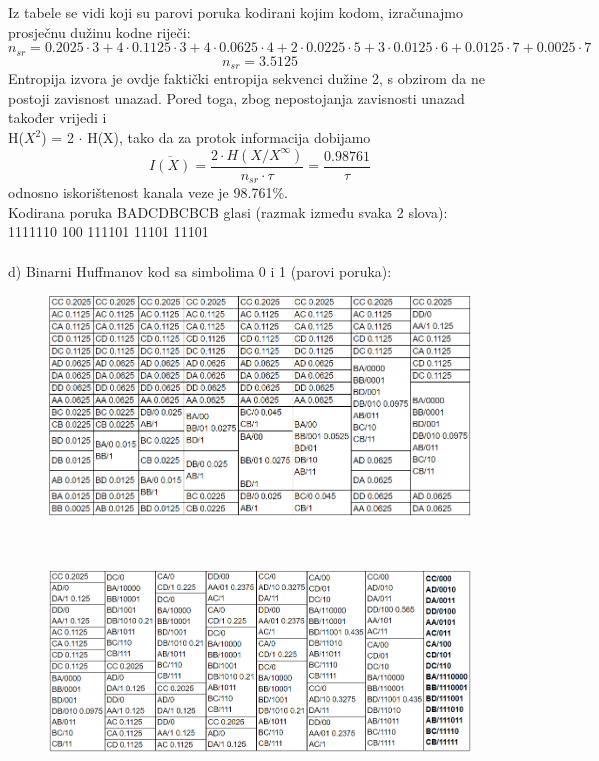 \documentclass[12pt]{article}
\begin{document}
\begin{enumerate}
\begin{figure}[htp]
\end{figure}
\\
\\
Iz tabele se vidi koji su parovi poruka kodirani kojim kodom, izračunajmo
prosječnu dužinu kodne riječi:
\begin{equation*}
    n_{sr} = 0.2025 \cdot 3 + 4 \cdot 0.1125 \cdot 3 + 4\cdot 0.0625 \cdot 4 + 2\cdot0.0225 \cdot 5 +3\cdot 0.0125 \cdot 6 +
    0.0125 \cdot 7 + 0.0025 \cdot 7
\end{equation*}
\begin{equation*}
     n_{sr} = 3.5125
\end{equation*}
Entropija izvora je ovdje faktički entropija sekvenci dužine 2, s obzirom
da ne postoji zavisnost unazad. Pored toga, zbog nepostojanja zavisnosti unazad također vrijedi i \\ H($X^2$) = 2 ${\cdot}$ H(X), tako da za protok
informacija dobijamo
\begin{equation*}
    \overline{I(X)} = \frac{2 \cdot H(X/X^\infty)}{n_{sr} \cdot \tau} = \frac{0.98761}{\tau}
\end{equation*}
odnosno iskorištenost kanala veze je 98.761\%. \\
Kodirana poruka BADCDBCBCB glasi (razmak između svaka 2 slova): \\
1111110 100 111101 11101 11101
\\
\\
d) Binarni Huffmanov kod sa simbolima 0 i 1 (parovi poruka):
\\
\begin{figure}[htp]
    \centering
    \includegraphics[width=18cm]{6d_1.png}
\end{figure}
\\
\newpage

\begin{figure}[htp]
    \centering
    \includegraphics[width=18cm]{6d_2.png}
\end{figure}


\end{enumerate}
\end{document}
